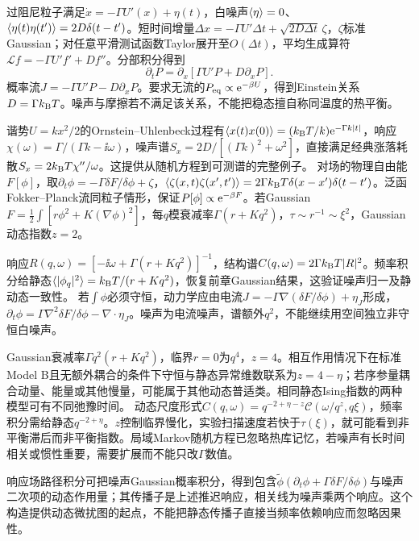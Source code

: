 \label{ch:dynamics}
过阻尼粒子满足$\dot x=-\Gamma U'(x)+\eta(t)$，白噪声$\langle \eta\rangle=0$、$\langle \eta(t)\eta(t')\rangle=2D\delta(t-t')$。短时间增量$\Delta x=-\Gamma U'\Delta t+\sqrt{2D\Delta t}\,\zeta$，$\zeta$标准Gaussian；对任意平滑测试函数Taylor展开至$O(\Delta t)$，平均生成算符$\mathcal Lf=-\Gamma U'f'+Df''$。分部积分得到
\begin{equation}
\partial_tP=\partial_x[\Gamma U'P+D\partial_xP].
\end{equation}
概率流$J=-\Gamma U'P-D\partial_xP$。要求无流的$P_{\rm eq}\propto\mathrm e^{-\beta U}$，得到Einstein关系$D=\Gamma k_{\mathrm B} T$。噪声与摩擦若不满足该关系，不能把稳态擅自称同温度的热平衡。

谐势$U=kx^2/2$的Ornstein--Uhlenbeck过程有$\langle x(t)x(0)\rangle=(k_{\mathrm B} T/k)\mathrm e^{-\Gamma k|t|}$，响应$\chi(\omega)=\Gamma/(\Gamma k-\ii\omega)$，噪声谱$S_x=2D/[(\Gamma k)^2+\omega^2]$，直接满足经典涨落耗散$S_x=2k_{\mathrm B} T\chi''/\omega$。这提供从随机方程到可测谱的完整例子。
对场的物理自由能$F[\phi]$，取$\partial_t\phi=-\Gamma\delta F/\delta\phi+\zeta$，$\langle \zeta(x,t)\zeta(x',t')\rangle=2\Gamma k_{\mathrm B} T\delta(x-x')\delta(t-t')$。泛函Fokker--Planck流同粒子情形，保证$P[\phi]\propto\mathrm e^{-\beta F}$。若Gaussian$F=\frac12\int[r\phi^2+K(\nabla\phi)^2]$，每$q$模衰减率$\Gamma(r+Kq^2)$，$\tau\sim r^{-1}\sim\xi^2$，Gaussian动态指数$z=2$。

响应$R(q,\omega)=[-\ii\omega+\Gamma(r+Kq^2)]^{-1}$，结构谱$C(q,\omega)=2\Gamma k_{\mathrm B} T|R|^2$。频率积分给静态$\langle |\phi_q|^2\rangle=k_{\mathrm B} T/(r+Kq^2)$，恢复前章Gaussian结果，这验证噪声归一及静动态一致性。
若$\int\phi$必须守恒，动力学应由电流$J=-\Gamma\nabla(\delta F/\delta\phi)+\eta_J$形成，$\partial_t\phi=\Gamma\nabla^2\delta F/\delta\phi-\nabla\cdot\eta_J$。噪声为电流噪声，谱额外$q^2$，不能继续用空间独立非守恒白噪声。

Gaussian衰减率$\Gamma q^2(r+Kq^2)$，临界$r=0$为$q^4$，$z=4$。相互作用情况下在标准Model B且无额外耦合的条件下守恒与静态异常维数联系为$z=4-\eta$；若序参量耦合动量、能量或其他慢量，可能属于其他动态普适类。相同静态Ising指数的两种模型可有不同弛豫时间。
动态尺度形式$C(q,\omega)=q^{-2+\eta-z}\mathcal C(\omega/q^z,q\xi)$，频率积分需给静态$q^{-2+\eta}$。$z$控制临界慢化，实验扫描速度若快于$\tau(\xi)$，就可能看到非平衡滞后而非平衡指数。局域Markov随机方程已忽略热库记忆，若噪声有长时间相关或惯性重要，需要扩展而不能只改$\Gamma$数值。

响应场路径积分可把噪声Gaussian概率积分，得到包含$\widetilde\phi(\partial_t\phi+\Gamma\delta F/\delta\phi)$与噪声二次项的动态作用量；其传播子是上述推迟响应，相关线为噪声乘两个响应。这个构造提供动态微扰图的起点，不能把静态传播子直接当频率依赖响应而忽略因果性。
